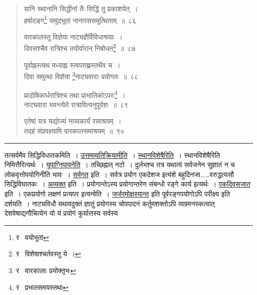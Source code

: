 \documentclass[11pt, openany]{book}
\begin{document}
\begin{quote}
{\na यानि स्थानानि सिद्धीनां तैः सिद्धिं तु प्रकाशयेत्~।\\
हर्षादङ्ग\renewcommand{\thefootnote}{1}\footnote{र \textendash\  वयोभूतां} समुद्भूतां नानारससमुत्थिताम्~॥~८६

वारकालस्तु विज्ञेया नाट्यज्ञैर्विविधाश्रयाः~।\\
दिवसश्चैव रात्रिश्च तयोर्वारान् निबोधत\renewcommand{\thefootnote}{2}\footnote{र \textendash\  विशेषाश्चर्तवस्तु ये~।}~॥~८७

पूर्वाह्नस्त्वथ मध्याह्न स्त्वपराह्णस्तथैव च~।\\
दिवा समुत्था विज्ञेया \renewcommand{\thefootnote}{3}\footnote{र \textendash\  वारकालाः प्रयोक्तृभः}नाट्यवाराः प्रयोगतः~॥~८८

प्रादोषिकार्धरात्रिश्च तथा प्राभातिकोऽपरः\renewcommand{\thefootnote}{4}\footnote{र \textendash\  प्रभातसमयस्तथा}~।\\
नाट्यवारा भवन्त्येते रात्रावित्यनुपूर्वशः~॥~८९

एतेषां यत्र यद्योज्यं नाव्यकार्यं रसाश्रयम्~।\\
तदहं संप्रवक्ष्यामि वारकालसमाश्रयम्~॥~९०}
\end{quote}

\hrule

\vspace{2mm}
\noindent
तत्सर्वमैव सिद्धिविधातकमिति~। \underline{उत्तमव्यतिक्रियामीति}~। \underline{स्थानविशेषैरिति}~। स्थानविशेषैरिति निमित्तैरित्यर्थः~। \underline{यूपाग्निपावनेति}~। तच्छिह्नात् नटो~। दुर्लभश्च तत्र यथात्वं सर्वजनेन सुज्ञातं न च लोकवृत्तोपयोगिनीति भावः~। \underline{सर्वगत} इति~। सर्वत्र प्रयोग एकदेशज इत्यंशे बहुदिनजा\ldots \ldots वरुद्धत्यसौ सिद्धिविघातकः~। \underline{अव्यक्त} इति~। प्रयोगान्तेऽस्य प्रयोगान्तरेण संबन्धो रङ्गे कार्य इत्यर्थः~। \underline{एकदिवसजात} इति~। एकप्रयोगो लक्षणं प्रत्यपर इत्यन्वेति~। \underline{जर्जरमोक्षस्यान्त} इति पूर्वरङ्गपयोगोऽपि परीक्ष्य इति दर्शयति~। नाट्यविधौ यथावदुक्तं ज्ञातुं प्रयोगस्य चोपपादनं कर्तुमशक्तोऽपि व्यग्रमनस्कत्वात् देशवेषाद्यनौचित्येन यो यं प्रयोगं कुर्यात्तस्य सर्वस्य

\newpage
\end{document}
